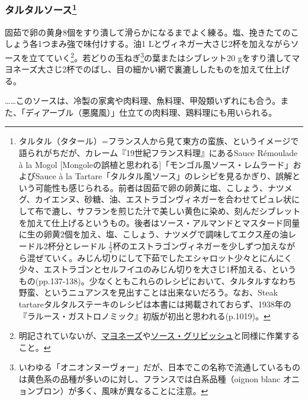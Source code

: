 \begin{recette}
\hypertarget{sauce-tartare}{%
\subsubsection[タルタルソース]{\texorpdfstring{タルタルソース\footnote{タルタル（タタール）=フランス人から見て東方の蛮族、というイメージで語られがちだが、カレーム『19世紀フランス料理』にあるSauce
  Rémoulade à la Mogol
  {[}Mongoleの誤植と思われる{]}「モンゴル風ソース・レムラード」およびSauce
  à la
  Tartare「タルタル風ソース」のレシピを見るかぎり、誤解という可能性も感じられる。前者は固茹で卵の卵黄に塩、こしょう、ナツメグ、カイエンヌ、砂糖、油、エストラゴンヴィネガーを合わせてピュレ状にして布で漉し、サフランを煎じた汁で美しい黄色に染め、刻んだシブレットを加えて仕上げるというもの。後者はソース・アルマンドとマスタード同量に生の卵黄2個を加え、塩、こしょう、ナツメグで調味してエクス産の油レードル2杯分とレードル
  \(\frac{1}{2}\)杯のエストラゴンヴィネガーを少しずつ加えながら混ぜていく。みじん切りにして下茹でしたエシャロット少々とにんにく少々、エストラゴンとセルフイユのみじん切りを大さじ1杯加える、というもの(pp.137-138)。少なくともこれらのレシピにおいて、タルタルすなわち野蛮、というニュアンスを見出すことは出来ないだろう。なお、Steak
  tartareタルタルステーキのレシピは本書には掲載されておらず、1938年の『ラルース・ガストロノミック』初版が初出と思われる(p.1019)。}}{タルタルソース}}\label{sauce-tartare}}



固茹で卵の黄身8個をすり潰して滑らかになるまでよく練る。塩、挽きたてのこしょう各1つまみ強で味付けする。油1
Lとヴィネガー大さじ2杯を加えながらソースを立てていく\footnote{明記されていないが、\protect\hyperlink{mayonnaise}{マヨネーズ}や\protect\hyperlink{sauce-gribiche}{ソース・グリビッシュ}と同様に作業すること。}。若どりの玉ねぎ\footnote{いわゆる「オニオンヌーヴォー」だが、日本でこの名称で流通しているものは黄色系の品種が多いのに対し、フランスでは白系品種（oignon
  blanc オニョンブロン）が多く、風味が異なることに注意。}の葉またはシブレット20
gをすり潰してマヨネーズ大さじ2杯でのばし、目の細かい網で裏漉ししたものを加えて仕上げる。

\ldots{}\ldots{}このソースは、冷製の家禽や肉料理、魚料理、甲殻類いずれにも合う。また、「ディアーブル（悪魔風）」仕立ての肉料理、鶏料理にも用いられる。


\end{recette}
